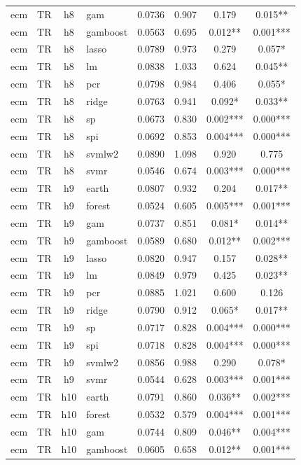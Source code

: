 \begin{ThreePartTable}
\begin{longtable}[t]{llclcccc}
ecm & TR & h8 & gam & 0.0736 & 0.907 & 0.179 & 0.015**\\
ecm & TR & h8 & gamboost & 0.0563 & 0.695 & 0.012** & 0.001***\\
ecm & TR & h8 & lasso & 0.0789 & 0.973 & 0.279 & 0.057*\\
ecm & TR & h8 & lm & 0.0838 & 1.033 & 0.624 & 0.045**\\
ecm & TR & h8 & pcr & 0.0798 & 0.984 & 0.406 & 0.055*\\
ecm & TR & h8 & ridge & 0.0763 & 0.941 & 0.092* & 0.033**\\
ecm & TR & h8 & sp & 0.0673 & 0.830 & 0.002*** & 0.000***\\
ecm & TR & h8 & spi & 0.0692 & 0.853 & 0.004*** & 0.000***\\
ecm & TR & h8 & svmlw2 & 0.0890 & 1.098 & 0.920 & 0.775\\
ecm & TR & h8 & svmr & 0.0546 & 0.674 & 0.003*** & 0.000***\\
\addlinespace
ecm & TR & h9 & earth & 0.0807 & 0.932 & 0.204 & 0.017**\\
ecm & TR & h9 & forest & 0.0524 & 0.605 & 0.005*** & 0.001***\\
ecm & TR & h9 & gam & 0.0737 & 0.851 & 0.081* & 0.014**\\
ecm & TR & h9 & gamboost & 0.0589 & 0.680 & 0.012** & 0.002***\\
ecm & TR & h9 & lasso & 0.0820 & 0.947 & 0.157 & 0.028**\\
ecm & TR & h9 & lm & 0.0849 & 0.979 & 0.425 & 0.023**\\
ecm & TR & h9 & pcr & 0.0885 & 1.021 & 0.600 & 0.126\\
ecm & TR & h9 & ridge & 0.0790 & 0.912 & 0.065* & 0.017**\\
ecm & TR & h9 & sp & 0.0717 & 0.828 & 0.004*** & 0.000***\\
ecm & TR & h9 & spi & 0.0718 & 0.828 & 0.004*** & 0.000***\\
ecm & TR & h9 & svmlw2 & 0.0856 & 0.988 & 0.290 & 0.078*\\
ecm & TR & h9 & svmr & 0.0544 & 0.628 & 0.003*** & 0.001***\\
\addlinespace
ecm & TR & h10 & earth & 0.0791 & 0.860 & 0.036** & 0.002***\\
ecm & TR & h10 & forest & 0.0532 & 0.579 & 0.004*** & 0.001***\\
ecm & TR & h10 & gam & 0.0744 & 0.809 & 0.046** & 0.004***\\
ecm & TR & h10 & gamboost & 0.0605 & 0.658 & 0.012** & 0.001***\\

\end{longtable}
\end{ThreePartTable}
